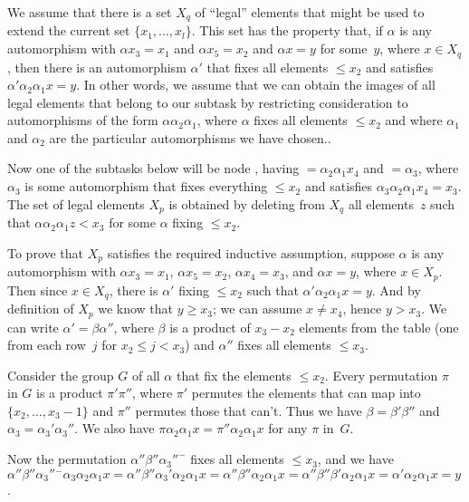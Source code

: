 We assume that there is a set $X_q$ of ``legal'' elements that might be used
to extend the current set $\{x_1,\ldots,x_l\}$. This set has the property
that, if $\alpha$ is any automorphism with $\alpha x_3=x_1$ and $\alpha
x_5=x_2$ and $\alpha x=y$ for some~$y$, where $x\in X_q$, then there is
an automorphism $\alpha'$ that fixes all elements $\le x_2$ and satisfies
$\alpha'\alpha_2\alpha_1 x=y$. In other words, we assume that we can obtain
the images
of all legal elements that belong to our subtask by restricting consideration
to automorphisms of the form $\alpha\alpha_2\alpha_1$, where $\alpha$
fixes all elements $\le x_2$ and where $\alpha_1$ and $\alpha_2$ are the
particular automorphisms we have chosen..

Now one of the subtasks below  will be node , having
${}=\alpha_2\alpha_1x_4$ and ${}=%
\alpha_3$, where $\alpha_3$
is some automorphism that fixes everything $\le x_2$ and satisfies
$\alpha_3\alpha_2\alpha_1x_4=x_3$. The set of legal elements $X_p$ is obtained
by deleting from $X_q$ all elements~$z$ such that $\alpha\alpha_2\alpha_1z
< x_3$ for some $\alpha$ fixing $\le x_2$.

To prove that $X_p$ satisfies the required inductive assumption, suppose
$\alpha$ is any automorphism with $\alpha x_3=x_1$, $\alpha x_5=x_2$,
$\alpha x_4=x_3$, and $\alpha x=y$, where $x\in X_p$. Then since $x\in X_q$,
there is $\alpha'$ fixing $\le x_2$ such that $\alpha'\alpha_2\alpha_1x=y$.
And by definition of $X_p$ we know that $y\ge x_3$; we can assume $x\ne x_4$,
hence $y>x_3$. We can write $\alpha'=
\beta\alpha''$, where $\beta$ is a product of $x_3-x_2$ elements from the
 table (one from each row~$j$ for $x_2\le j<x_3$) and $\alpha''$
fixes
all elements $\le x_3$.

Consider the group $G$ of all $\alpha$ that fix the elements $\le x_2$. Every
permutation $\pi$ in $G$ is a product $\pi'\pi''$, where $\pi'$ permutes
the elements that can map into $\{x_2,\ldots,x_3-1\}$ and $\pi''$ permutes
those that can't. Thus we have $\beta=\beta'\beta''$ and $\alpha_3=
\alpha_3'\alpha_3''$. We also have
$\pi\alpha_2\alpha_1x=\pi''\alpha_2\alpha_1x$ for any $\pi$ in~$G$.

Now the permutation $\alpha''\beta''\alpha_3''^{-}$ fixes all elements
$\le x_3$, and we have
$\alpha''\beta''\alpha_3''{}^{-}\alpha_3\alpha_2\alpha_1x=
\alpha''\beta''\alpha_3'\alpha_2\alpha_1x=
\alpha''\beta''\alpha_2\alpha_1x=
\alpha''\beta''\beta'\alpha_2\alpha_1x=
\alpha'\alpha_2\alpha_1x=y$.

